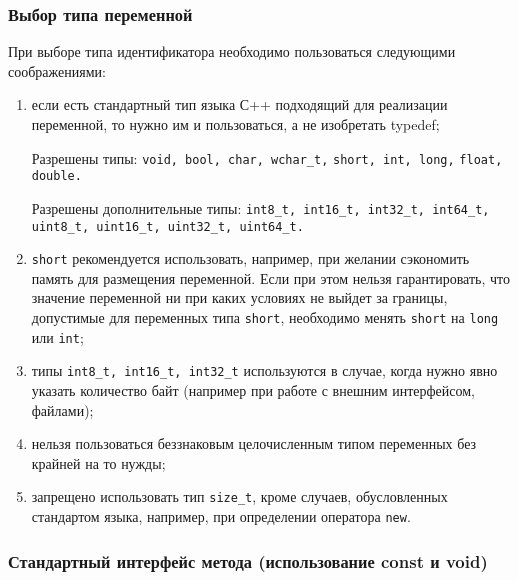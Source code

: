 {{{%
\subsubsection{Выбор типа переменной}

При выборе типа идентификатора необходимо пользоваться следующими соображениями:

\begin{enumerate}
\item если есть стандартный тип языка С++ подходящий для реализации переменной, то нужно им и пользоваться, а не изобретать typedef;

Разрешены типы:
\newline \lstinline|void, bool, char, wchar_t,|
\newline \lstinline|short, int, long,|
\newline \lstinline|float, double.|

Разрешены дополнительные типы:
\newline \lstinline|int8_t, int16_t, int32_t, int64_t,|
\newline \lstinline|uint8_t, uint16_t, uint32_t, uint64_t.|

\item \lstinline|short| рекомендуется использовать, например, при желании сэкономить память для размещения переменной. Если при этом нельзя гарантировать, что значение переменной ни при каких условиях не выйдет за границы, допустимые для переменных типа \lstinline|short|, необходимо менять \lstinline|short| на \lstinline|long| или \lstinline|int|;

\item типы \lstinline|int8_t, int16_t, int32_t| используются в случае, когда нужно явно указать количество байт (например при работе с внешним интерфейсом, файлами); 

\item нельзя пользоваться беззнаковым целочисленным типом переменных без крайней на то нужды;
\item запрещено использовать тип \lstinline|size_t|, кроме случаев, обусловленных стандартом языка, например, при определении оператора \lstinline|new|.

\end{enumerate}

\newpage
\subsubsection{Стандартный интерфейс метода (использование const и void)}

}}}

